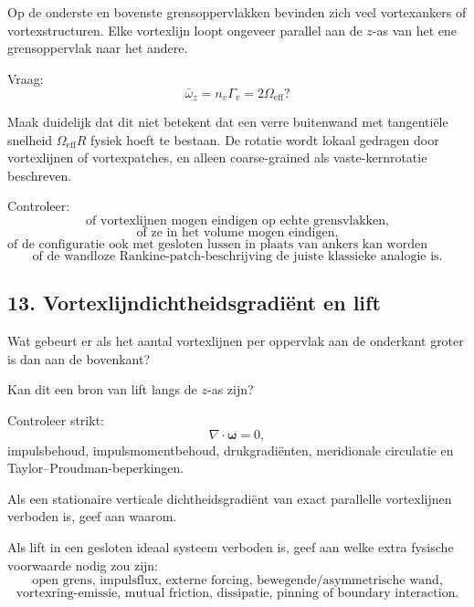 \documentclass[11pt]{article}
\begin{document}
        Op de onderste en bovenste grensoppervlakken bevinden zich veel vortexankers of vortexstructuren. Elke vortexlijn loopt ongeveer parallel aan de \(z\)-as van het ene grensoppervlak naar het andere.
        
        Vraag:
        \[
            \bar{\omega}_z
            =
            n_v\Gamma_v
            =
            2\Omega_{\mathrm{eff}}?
        \]
        
        Maak duidelijk dat dit niet betekent dat een verre buitenwand met tangentiële snelheid \(\Omega_{\mathrm{eff}}R\) fysiek hoeft te bestaan. De rotatie wordt lokaal gedragen door vortexlijnen of vortexpatches, en alleen coarse-grained als vaste-kernrotatie beschreven.
        
        Controleer:
        \[
            \text{of vortexlijnen mogen eindigen op echte grensvlakken,}
        \]
        \[
            \text{of ze in het volume mogen eindigen,}
        \]
        \[
            \text{of de configuratie ook met gesloten lussen in plaats van ankers kan worden geformuleerd,}
        \]
        \[
            \text{of de wandloze Rankine-patch-beschrijving de juiste klassieke analogie is.}
        \]
    
    \subsection{13. Vortexlijndichtheidsgradiënt en lift}
        
        Wat gebeurt er als het aantal vortexlijnen per oppervlak aan de onderkant groter is dan aan de bovenkant?
        
        Kan dit een bron van lift langs de \(z\)-as zijn?
        
        Controleer strikt:
        \[
            \nabla\cdot\boldsymbol{\omega}=0,
        \]
        impulsbehoud, impulsmomentbehoud, drukgradiënten, meridionale circulatie en Taylor--Proudman-beperkingen.
        
        Als een stationaire verticale dichtheidsgradiënt van exact parallelle vortexlijnen verboden is, geef aan waarom.
        
        Als lift in een gesloten ideaal systeem verboden is, geef aan welke extra fysische voorwaarde nodig zou zijn:
        \[
            \text{open grens, impulsflux, externe forcing, bewegende/asymmetrische wand,}
        \]
        \[
            \text{vortexring-emissie, mutual friction, dissipatie, pinning of boundary interaction.}
        \]
    
\end{document}
